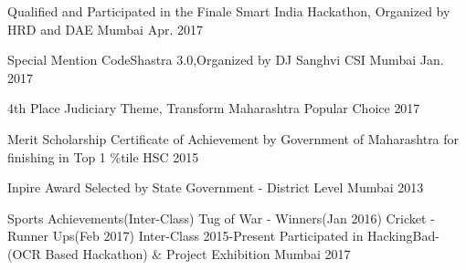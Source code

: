



\begin{cvhonors}

  \cvhonor
    {Qualified and Participated in the Finale} %
    {Smart India Hackathon, Organized by HRD and DAE} %
    {Mumbai} %
    {Apr. 2017} %

  \cvhonor
    {Special Mention} %
    {CodeShastra 3.0,Organized by DJ Sanghvi CSI} %
    {Mumbai} %
    {Jan. 2017} %

  \cvhonor
    {4th Place} %
    {Judiciary Theme, Transform Maharashtra} %
    {Popular Choice} %
    {2017} %

  \cvhonor
    {Merit Scholarship} %
    {Certificate of Achievement by Government of Maharashtra for finishing in Top 1 \%tile} %
    {HSC} %
    {2015} %

  \cvhonor
    {Inpire Award} %
    {Selected by State Government - District Level} %
    {Mumbai} %
    {2013} %

  \cvhonor
    {Sports Achievements(Inter-Class)} %
    {Tug of War - Winners(Jan 2016)  Cricket - Runner Ups(Feb 2017)} %
    {Inter-Class} %
    {2015-Present} %
  \cvhonor
    {Participated in} %
    {HackingBad-(OCR Based Hackathon) \& Project Exhibition} %
    {Mumbai} %
    {2017} %
\end{cvhonors}


